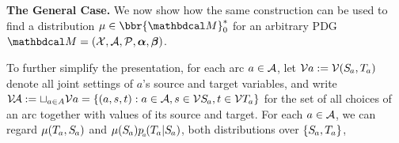 \documentclass[twoside]{article}
\newcommand\discard[1]{}
\begin{document}
\textbf{The General Case.}
We now show how the same construction can be used to find
 a distribution $\mu \in \bbr{\dg M}^*_0$
for an arbitrary PDG $\dg M = (\X, \Ar, \mathcal P, \balpha, \bbeta)$.
\discard{\color{gray}Now that we have a taste for how this works in terms of matrices,
    let's now move up a level,
    and identify distributions with their simplex representations.}
%
To further simplify the presentation,
for each arc $a \in \mathcal A$, let
$\V a := \V(\Src a, \Tgt a)$
denote all joint settings of $a$'s source and target variables, and
write
$
\V\!\Ar :%
    = \sqcup_{a \in A} \V a
    = \{ (a, s, t) : a \in \Ar, s \in \V \Src a, t \in \V\Tgt a \}
$
for the set of all choices of an arc together with values of its source and target.
%
For each $a \in \mathcal A$, 
we can regard $\mu(\Tgt a, \Src a)$ and $\mu(\Src a)p\ssub a(\Tgt a | \Src a)$, both distributions over $\{\Src a,\Tgt a\}$, 
\end{document}
